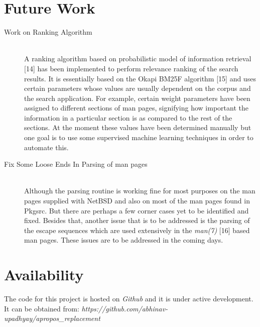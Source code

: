 \documentclass[titlepage, a4paper, 12pt]{article}
\begin{document}
\section{Future Work}
\begin{description}
\item[Work on Ranking Algorithm] \hfill \\
A ranking algorithm based on probabilistic model of information retrieval [14]
has been implemented to perform relevance ranking of the search
results. It is essentially based on the Okapi BM25F algorithm [15] and
uses certain parameters whose values are usually dependent on the corpus and the
search application. For example, certain weight parameters have been assigned to
different sections of man pages, signifying how important the information in a
particular section is as compared to the rest of the sections. At the moment
these values have been determined
manually but one goal is to use some supervised machine learning techniques in
order to automate this.
\end{description}
\begin{description}
\item[Fix Some Loose Ends In Parsing of man pages] \hfill \\
Although the parsing routine is working fine for most purposes on the man pages
supplied with NetBSD and also on most of the man pages found in Pkgsrc. But there
are perhaps a few corner cases yet to be identified and fixed. Besides that,
another issue that is to be addressed is the parsing of the escape sequences
which are used extensively in the \textit{man(7)} [16] based man pages. These
issues are to be addressed in the coming days.
\end{description}
\section{Availability}
The code for this project is hosted on \textit{Github} and it is under active development. It can be obtained from:\newline
 \emph{https://github.com/abhinav-upadhyay/apropos\_replacement}
\end{document}
